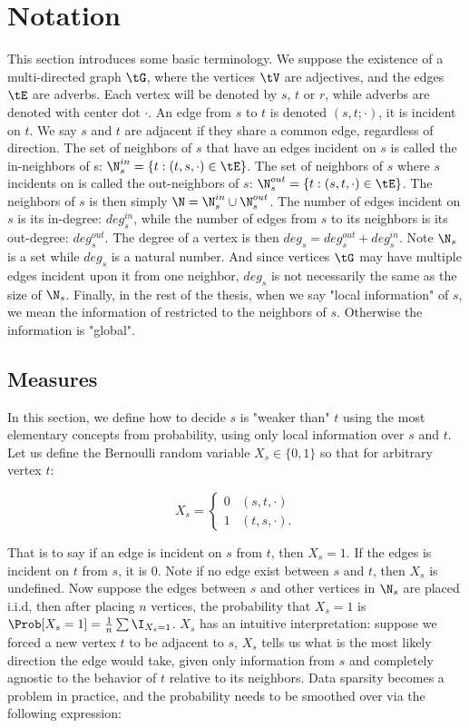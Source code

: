 \section{Notation}

This section introduces some basic terminology. We suppose the existence of a multi-directed graph $\tG$, where the vertices $\tV$ are adjectives, and the edges $\tE$ are adverbs. Each vertex will be denoted by $s$, $t$ or $r$, while adverbs are denoted with center dot $\cdot$. An edge from $s$ to $t$ is denoted $(s,t; \cdot)$, it is incident on $t$. We say $s$ and $t$ are adjacent if they share a common edge, regardless of direction. The set of neighbors of $s$ that have an edges incident on $s$ is called the in-neighbors of s: $\N^{in}_s = \{ t : (t,s, \cdot) \in \tE \}$. The set of neighbors of $s$ where $s$ incidents on is called the out-neighbors of $s$: $\N^{out}_s = \{ t : (s,t, \cdot) \in \tE \}$. The neighbors of $s$ is then simply $\N = \N^{in}_s \cup \N^{out}_s$. The number of edges incident on $s$ is its in-degree: $deg^{in}_s$, while the number of edges from $s$ to its neighbors is its out-degree: $deg^{out}_s$. The degree of a vertex is then $deg_s = deg^{out}_s + deg^{in}_s$. Note $\N_s$ is a set while $deg_s$ is a natural number. And since vertices $\tG$ may have multiple edges incident upon it from one neighbor, $deg_s$ is not necessarily the same as the size of $\N_s$. Finally, in the rest of the thesis, when we say "local information" of $s$, we mean the information of restricted to the neighbors of $s$. Otherwise the information is "global".

\subsection{Measures}

In this section, we define how to decide $s$ is "weaker than" $t$ using the most elementary concepts from probability, using only local information over $s$ and $t$. Let us define the Bernoulli random variable $X_s \in \{0,1\}$ so that for arbitrary vertex $t$:

\begin{equation}
X_{s} = \begin{cases} 
	0 & (s,t, \cdot) \\
	1  & (t,s, \cdot).
\end{cases}
\end{equation}

That is to say if an edge is incident on $s$ from $t$, then $X_s = 1$. If the edges is incident on $t$ from $s$, it is $0$. Note if no edge exist between $s$ and $t$, then $X_s$ is undefined. Now suppose the edges between $s$ and other vertices in $\N_s$ are placed i.i.d, then after placing $n$ vertices, the probability that $X_s = 1$ is $\Prob[X_s = 1] = \frac{1}{n} \sum \I_{X_s = 1}$. $X_s$ has an intuitive interpretation: suppose we forced a new vertex $t$ to be adjacent to $s$, $X_s$ tells us what is the most likely direction the edge would take, given only information from $s$ and completely agnostic to the behavior of $t$ relative to its neighbors. Data sparsity becomes a problem in practice, and the probability needs to be smoothed over via the following expression:

